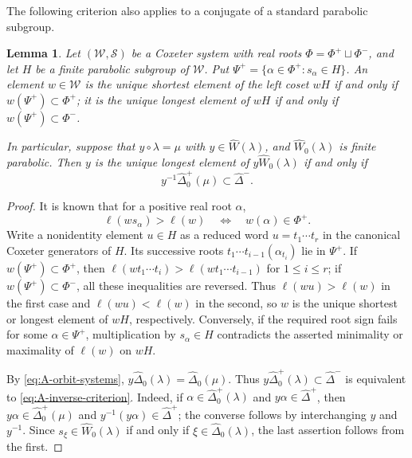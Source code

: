 \documentclass[11pt,a4paper]{amsart}
\theoremstyle{plain}
\newtheorem{lem}[theorem]{Lemma}
\numberwithin{equation}{section}
\newenvironment{pf}{\begin{proof}}{\end{proof}}
\begin{document}
The following criterion also applies to a conjugate of a standard
parabolic subgroup.
\begin{lem}\label{lem:A-coset-root-criterion}
Let \((\mathcal W,\mathcal S)\) be a Coxeter system with real roots
\(\Phi=\Phi^+\sqcup\Phi^-\), and let \(H\) be a finite parabolic
subgroup of \(\mathcal W\). Put
\(\Psi^+=\{\alpha\in\Phi^+:s_\alpha\in H\}\).
An element \(w\in\mathcal W\) is the unique shortest element of
the left coset \(wH\) if and only if
\(w(\Psi^+)\subset\Phi^+\); it is the unique longest element of
\(wH\) if and only if \(w(\Psi^+)\subset\Phi^-\).

In particular, suppose that \(y\circ\lambda=\mu\) with
\(y\in\widehat W(\lambda)\), and \(\widehat W_0(\lambda)\)  is finite
parabolic. Then \(y\) is the unique longest element of
\(y\widehat W_0(\lambda)\) if and only if
\begin{equation}\label{eq:A-inverse-criterion}
y^{-1}\widehat\Delta_0^+(\mu)\subset\widehat\Delta^-.
\end{equation}
\end{lem}
\begin{pf} It is known that
for a positive real root \(\alpha\),
\[
\ell(ws_\alpha)>\ell(w)
\quad\Longleftrightarrow\quad w(\alpha)\in\Phi^+.
\]
Write a nonidentity element \(u\in H\) as a reduced word
\(u=t_1\cdots t_r\) in the canonical Coxeter generators of \(H\).
Its successive roots
\(t_1\cdots t_{i-1}(\alpha_{t_i})\) lie in \(\Psi^+\).
If \(w(\Psi^+)\subset\Phi^+\), then
\(\ell(wt_1\cdots t_i)>\ell(wt_1\cdots t_{i-1})\) for
\(1\le i\le r\); if \(w(\Psi^+)\subset\Phi^-\), all these
inequalities are reversed. Thus \(\ell(wu)>\ell(w)\) in the first
case and \(\ell(wu)<\ell(w)\) in the second, so \(w\) is the
unique shortest or longest element of \(wH\), respectively. Conversely, if the required root sign fails for
some \(\alpha\in\Psi^+\), multiplication by \(s_\alpha\in H\)
contradicts the asserted minimality or maximality of \(\ell(w)\)
on \(wH\).

By \eqref{eq:A-orbit-systems},
\(y\widehat\Delta_0(\lambda)=\widehat\Delta_0(\mu)\).
Thus \(y\widehat\Delta_0^+(\lambda)\subset\widehat\Delta^-\)
is equivalent to \eqref{eq:A-inverse-criterion}. Indeed, if
\(\alpha\in\widehat\Delta_0^+(\lambda)\) and
\(y\alpha\in\widehat\Delta^+\), then
\(y\alpha\in\widehat\Delta_0^+(\mu)\) and
\(y^{-1}(y\alpha)\in\widehat\Delta^+\);
the converse follows by interchanging \(y\) and \(y^{-1}\).
Since \(s_\xi\in\widehat W_0(\lambda)\) if and only if
\(\xi\in\widehat\Delta_0(\lambda)\), the last assertion follows
from the first.
\end{pf}
\end{document}
